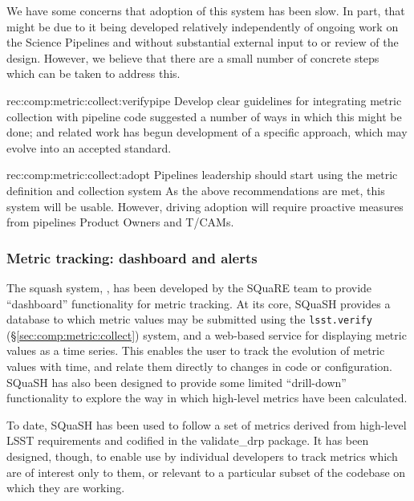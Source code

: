 We have some concerns that adoption of this system has been slow.
In part, that might be due to it being developed relatively independently of ongoing work on the Science Pipelines and without substantial external input to or review of the design.
However, we believe that there are a small number of concrete steps which can be taken to address this.

\begin{recommendation}
    {rec:comp:metric:collect:verifypipe}
    {Develop clear guidelines for integrating metric collection with pipeline code}
     suggested a number of ways in which this might be done;  and related work has begun development of a specific approach, which may evolve into an accepted standard.
\end{recommendation}

\begin{recommendation}
    {rec:comp:metric:collect:adopt}
    {Pipelines leadership should start using the metric definition and collection system}
    As the above recommendations are met, this system will be usable.
    However, driving adoption will require proactive measures from pipelines Product Owners and T/CAMs.
\end{recommendation}

\subsubsection{Metric tracking: dashboard and alerts}
\label{sec:comp:metric:dashboard}

The \gls{squash} system, , has been developed by the SQuaRE team to provide ``\gls{dashboard}'' functionality for metric tracking.
At its core, SQuaSH provides a database to which metric values may be submitted using the \texttt{lsst.verify} (\S\ref{sec:comp:metric:collect}) system, and a web-based service for displaying metric values as a time series.
This enables the user to track the evolution of metric values with time, and relate them directly to changes in code or configuration.
SQuaSH has also been designed to provide some limited ``drill-down'' functionality to explore the way in which high-level metrics have been calculated.

To date, SQuaSH has been used to follow a set of metrics derived from high-level LSST requirements and codified in the validate\_drp package.
It has been designed, though, to enable use by individual developers to track metrics which are of interest only to them, or relevant to a particular subset of the codebase on which they are working.


